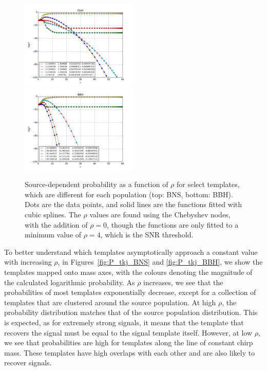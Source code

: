 \documentclass[twocolumn,showpacs,unsortedaddress,superscriptaddress,showkeys,nofootinbib,preprintnumbers,letterpaper]{revtex4-1}
\begin{document}
\begin{figure}
\includegraphics[width=0.5\textwidth]{lnP_vs_rho_Ozel.pdf}
\includegraphics[width=0.5\textwidth]{lnP_vs_rho_BBH.pdf}
\caption{Source-dependent probability as a function of $\rho$ for select templates, which are different for each population (top: BNS, bottom: BBH). Dots are the data points, and solid lines are the functions fitted with cubic splines. The $\rho$ values are found using the Chebyshev nodes, with the addition of $\rho=0$, though the functions are only fitted to a minimum value of $\rho=4$, which is the SNR threshold.}
\label{fig:Pvsrho}
\end{figure}

To better understand which templates asymptotically approach a constant value with increasing $\rho$, in Figures~\ref{fig:P_tkj_BNS} and \ref{fig:P_tkj_BBH}, we show the templates mapped onto mass axes, with the colours denoting the magnitude of the calculated logarithmic probability. As $\rho$ increases, we see that the probabilities of most templates exponentially decrease, except for a collection of templates that are clustered around the source population. At high $\rho$, the probability distribution matches that of the source population distribution. This is expected, as for extremely strong signals, it means that the template that recovers the signal must be equal to the signal template itself. However, at low $\rho$, we see that probabilities are high for templates along the line of constant chirp mass. These templates have high overlaps with each other and are also likely to recover signals.
\end{document}
